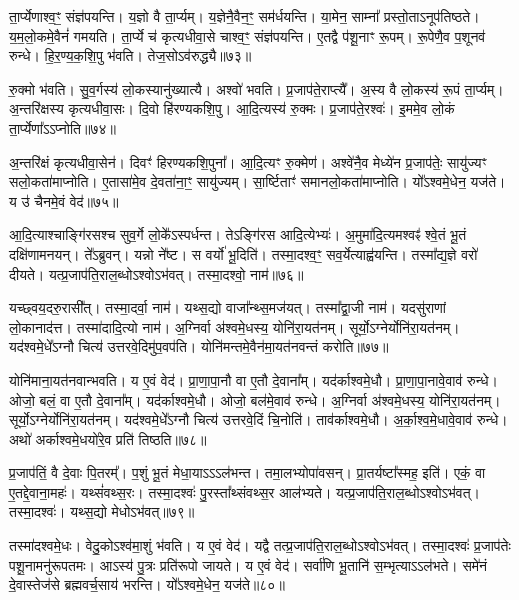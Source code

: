 ता॒र्प्येणाश्व॒ꣳ॒ संज्ञ॑पयन्ति।
य॒ज्ञो वै ता॒र्प्यम्।
य॒ज्ञेनै॒वैन॒ꣳ॒ सम॑र्धयन्ति।
या॒मेन॒ साम्ना᳚ प्रस्तो॒ता\-ऽनूप॑तिष्ठते।
य॒म॒लो॒कमे॒वैनं॑ गमयति।
ता॒र्प्ये च॑ कृत्यधीवा॒से चाश्व॒ꣳ॒ संज्ञ॑पयन्ति।
ए॒तद्वै प॑शू॒नाꣳ रू॒पम्।
रू॒पेणै॒व प॒शूनव॑ रुन्धे।
हि॒र॒ण्य॒क॒शि॒पु भ॑वति।
तेज॒सो\-ऽव॑रुद्ध्यै॥७३॥\ip

रु॒क्मो भ॑वति।
सु॒व॒र्गस्य॑ लो॒कस्यानु॑ख्यात्यै।
अश्वो॑ भवति।
प्र॒जा\-प॑ते॒राप्त्यै᳚।
अ॒स्य वै लो॒कस्य॑ रू॒पं ता॒र्प्यम्।
अ॒न्तरि॑क्षस्य कृत्यधीवा॒सः।
दि॒वो हि॑रण्यकशि॒पु।
आ॒दि॒त्यस्य॑ रु॒क्मः।
प्र॒जा\-प॑ते॒रश्वः॑।
इ॒ममे॒व लो॒कं ता॒र्प्येणा᳚ऽऽप्नोति॥७४॥\ip

अ॒न्तरि॑क्षं कृत्यधीवा॒सेन॑।
दिवꣳ॑ हिरण्यकशि॒पुना᳚।
आ॒दि॒त्यꣳ रु॒क्मेण॑।
अश्वे॑नै॒व मेध्ये॑न प्र॒जा\-प॑तेः॒ सायु॑ज्यꣳ स\-लो॒क\-ता॑\-माप्नोति।
ए॒तासा॑मे॒व दे॒वता॑ना॒ꣳ॒ सायु॑ज्यम्।
सा॒र्ष्टिताꣳ॑ समान\-लो॒क\-ता॑\-माप्नोति।
यो᳚ऽश्वमे॒धेन॒ यज॑ते।
य उ॑ चैनमे॒वं वेद॑॥७५॥\ip\anuvakamend[अव॑रुध्या आप्नोत्य॒ष्टौ च॑]

आ॒दि॒त्याश्चाङ्गि॑रसश्च सुव॒र्गे लो॒के᳚\-ऽस्पर्धन्त।
तेऽङ्गि॑रस आदि॒त्येभ्यः॑।
अ॒मुमा॑दि॒त्यमश्वꣴ॑ श्वे॒तं भू॒तं दक्षि॑णामनयन्।
ते᳚ऽब्रुवन्।
यन्नो ने᳚ष्ट।
स वर्यो॑ भू॒दिति॑।
तस्मा॒दश्व॒ꣳ॒ सव॒र्येत्याह्व॑यन्ति।
तस्मा᳚द्य॒ज्ञे वरो॑ दीयते।
यत्प्र॒जा\-प॑ति॒रा\-ल॒ब्धो\-ऽश्वो\-ऽभ॑वत्।
तस्मा॒दश्वो॒ नाम॑॥७६॥\ip

यच्छ्वय॒दरु॒रासी᳚त्।
तस्मा॒दर्वा॒ नाम॑।
यथ्स॒द्यो वाजा᳚न्थ्स॒म\-ज॑यत्।
तस्मा᳚द्वा॒जी नाम॑।
यदसु॑राणां लो॒कानाद॑त्त।
तस्मा॑दादि॒त्यो नाम॑।
अ॒ग्निर्वा अ॑श्वमे॒धस्य॒ योनि॑रा॒\-यत॑नम्।
सूर्यो॒\-ऽग्नेर्योनि॑रा॒\-यत॑नम्।
यद॑श्वमे॒धे᳚\-ऽग्नौ चित्य॑ उत्तरवे॒दिमु॑प॒वप॑ति।
योनि॑मन्तमे॒वैन॑मा॒यत॑नवन्तं करोति॥७७॥\ip

योनि॑माना॒यत॑नवान्भवति।
य ए॒वं वेद॑।
प्रा॒णा॒पा॒नौ वा ए॒तौ दे॒वाना᳚म्।
यद॑र्काश्वमे॒धौ।
प्रा॒णा॒पा॒नावे॒वाव॑ रुन्धे।
ओजो॒ बलं॒ वा ए॒तौ दे॒वाना᳚म्।
यद॑र्काश्वमे॒धौ।
ओजो॒ बल॑मे॒वाव॑ रुन्धे।
अ॒ग्निर्वा अ॑श्वमे॒धस्य॒ योनि॑रा॒यत॑नम्।
सूर्यो॒\-ऽग्नेर्योनि॑रा॒\-यत॑नम्।
यद॑श्वमे॒धे᳚\-ऽग्नौ चित्य॑ उत्तरवे॒दिं चि॒नोति॑।
ताव॑र्काश्वमे॒धौ।
अ॒र्का॒श्व॒मे॒धावे॒वाव॑ रुन्धे।
अथो॑ अर्काश्वमे॒धयो॑रे॒व प्रति॑ तिष्ठति॥७८॥\ip\anuvakamend[नाम॑ करोति॒ सूर्यो॒\-ऽग्नेर्योनि॑रा॒यत॑नञ्च॒त्वारि॑ च]

प्र॒जा\-प॑तिं॒ वै दे॒वाः पि॒तरम्᳚।
प॒शुं भू॒तं मेधा॒याऽऽऽल॑भन्त।
तमा॒लभ्योपा॑वसन्।
प्रा॒तर्यष्टा᳚स्मह॒ इति॑।
एकं॒ वा ए॒तद्दे॒वाना॒महः॑।
यथ्सं॑वथ्स॒रः।
तस्मा॒दश्वः॑ पु॒रस्ता᳚थ्संवथ्स॒र आल॑भ्यते।
यत्प्र॒जा\-प॑ति॒\-रा\-ल॒ब्धो\-ऽश्वो\-ऽभ॑वत्।
तस्मा॒दश्वः॑।
यथ्स॒द्यो मेधो\-ऽभ॑वत्॥७९॥\ip

तस्मा॑दश्वमे॒धः।
वेदु॒को\-ऽश्व॑मा॒शुं भ॑वति।
य ए॒वं वेद॑।
यद्वै तत्प्र॒जा\-प॑ति॒राल॒ब्धो\-ऽश्वो\-ऽभ॑वत्।
तस्मा॒दश्वः॑ प्र॒जा\-प॑तेः पशू॒नामनु॑रूपतमः।
आऽस्य॑ पु॒त्रः प्रति॑\-रूपो जायते।
य ए॒वं वेद॑।
सर्वा॑णि भू॒तानि॑ स॒म्भृत्याऽऽल॑भते।
समे॑नं दे॒वास्तेज॑से ब्रह्मवर्च॒साय॑ भरन्ति।
यो᳚ऽश्वमे॒धेन॒ यज॑ते॥८०॥\ip

